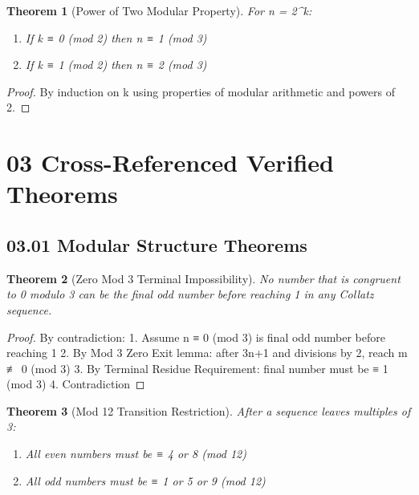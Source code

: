 \documentclass[11pt]{article}
\newtheorem{theorem}{Theorem}[section]
\begin{document}
\begin{theorem}[Power of Two Modular Property]
For n = 2^k:
\begin{enumerate}
    \item If k ≡ 0 (mod 2) then n ≡ 1 (mod 3)
    \item If k ≡ 1 (mod 2) then n ≡ 2 (mod 3)
\end{enumerate}
\end{theorem}

\begin{proof}
By induction on k using properties of modular arithmetic and powers of 2.
\end{proof}

\section*{\textbf{03 Cross-Referenced Verified Theorems}}

\subsection*{03.01 Modular Structure Theorems}

\begin{theorem}[Zero Mod 3 Terminal Impossibility]\label{thm:zero_mod3}
No number that is congruent to 0 modulo 3 can be the final odd number before reaching 1 in any Collatz sequence.
\end{theorem}

\begin{proof}
By contradiction:
1. Assume n ≡ 0 (mod 3) is final odd number before reaching 1
2. By Mod 3 Zero Exit lemma: after 3n+1 and divisions by 2, reach m ≢ 0 (mod 3)
3. By Terminal Residue Requirement: final number must be ≡ 1 (mod 3)
4. Contradiction
\end{proof}

\begin{theorem}[Mod 12 Transition Restriction]\label{thm:mod12_trans}
After a sequence leaves multiples of 3:
\begin{enumerate}
    \item All even numbers must be ≡ 4 or 8 (mod 12)
    \item All odd numbers must be ≡ 1 or 5 or 9 (mod 12)
\end{enumerate}
\end{theorem}
\end{document}

